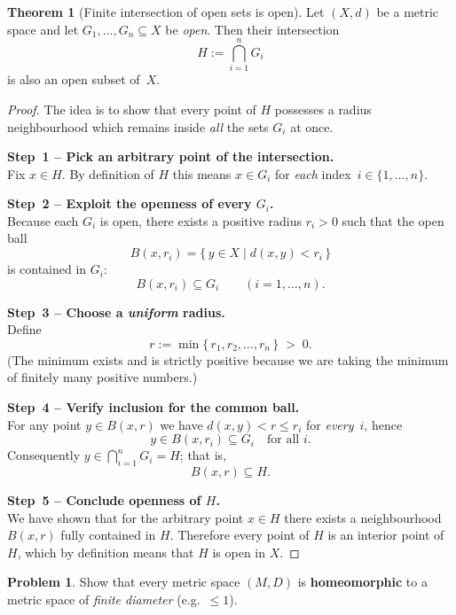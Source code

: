 \documentclass[12pt]{article}
\theoremstyle{definition} %
\newtheorem{problem}{Problem}
\newtheorem{theorem}{Theorem}
\theoremstyle{plain} %
\begin{document}
\begin{theorem}[Finite intersection of open sets is open]    %
  Let $(X,d)$ be a metric space and let $G_{1},\dots,G_{n}\subseteq X$
  be \emph{open}.  Then their intersection
  \[
      H:=\bigcap_{i=1}^{n}G_{i}
  \]
  is also an open subset of $X$.
\end{theorem}

\begin{proof}
  The idea is to show that every point of $H$ possesses a radius
  neighbourhood which remains inside \emph{all} the sets $G_{i}$ at once.

  \medskip
  \noindent\textbf{Step 1 – Pick an arbitrary point of the intersection.}\\
  Fix $x\in H$.  
  By definition of $H$ this means $x\in G_{i}$ for \emph{each}
  index $i\in\{1,\dots,n\}$.

  \medskip
  \noindent\textbf{Step 2 – Exploit the openness of every $G_{i}$.}\\
  Because each $G_{i}$ is open, there exists a positive
  radius $r_{i}>0$ such that the open ball
  \[
      B(x,r_{i})=\{\,y\in X\mid d(x,y)<r_{i}\,\}
  \]
  is contained in $G_{i}$:
  \[
      B(x,r_{i})\subseteq G_{i}\qquad(i=1,\dots,n).
  \]

  \medskip
  \noindent\textbf{Step 3 – Choose a \emph{uniform} radius.}\\
  Define
  \[
      r:=\min\{\,r_{1},r_{2},\dots,r_{n}\,\}\;>\;0.
  \]
  (The minimum exists and is strictly positive because we are taking the
  minimum of finitely many positive numbers.)

  \medskip
  \noindent\textbf{Step 4 – Verify inclusion for the common ball.}\\
  For any point $y\in B(x,r)$ we have $d(x,y)<r\le r_{i}$ for
  \emph{every} $i$, hence
  \[
      y\in B(x,r_{i})\subseteq G_{i}\quad\text{for all }i.
  \]
  Consequently $y\in\bigcap_{i=1}^{n}G_{i}=H$; that is,
  \[
      B(x,r)\subseteq H.
  \]

  \medskip
  \noindent\textbf{Step 5 – Conclude openness of $H$.}\\
  We have shown that for the arbitrary point $x\in H$ there exists a
  neighbourhood \(B(x,r)\) fully contained in $H$.  
  Therefore every point of $H$ is an interior point of $H$, which by
  definition means that \(H\) is open in \(X\).
\end{proof}

\begin{problem}
  Show that every metric space $(M,D)$ is \textbf{homeomorphic} to a metric
  space of \emph{finite diameter} (e.g.\ $\le 1$).
\end{problem}
\end{document}
